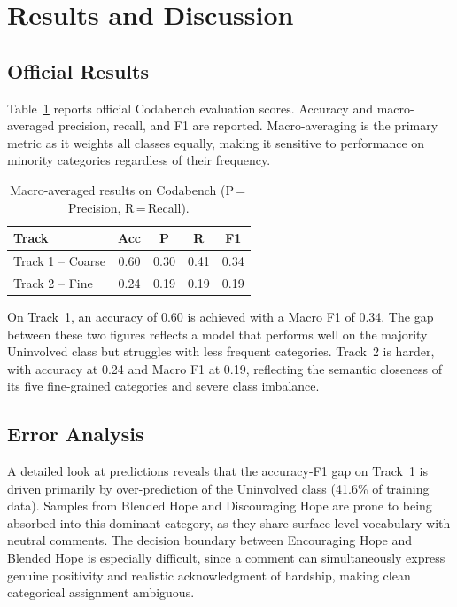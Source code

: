 \documentclass[11pt]{article}
\begin{document}
\section{Results and Discussion}

\subsection{Official Results}

Table~\ref{tab:results} reports official Codabench evaluation
scores. Accuracy and macro-averaged precision,
recall, and F1 are reported. Macro-averaging is
the primary metric as it weights all classes equally,
making it sensitive to performance on minority categories regardless of their frequency.

\begin{table}[h]
\centering
\begin{tabular}{lcccc}
\toprule
\textbf{Track} & \textbf{Acc} & \textbf{P} & \textbf{R} & \textbf{F1} \\
\midrule
Track 1 -- Coarse & 0.60 & 0.30 & 0.41 & 0.34 \\
Track 2 -- Fine   & 0.24 & 0.19 & 0.19 & 0.19 \\
\bottomrule
\end{tabular}
\caption{Macro-averaged results on Codabench (P\,=\,Precision, R\,=\,Recall).}
\label{tab:results}
\end{table}

On Track~1, an accuracy of 0.60 is achieved with
a Macro F1 of 0.34. The gap between these two
figures reflects a model that performs well on the
majority Uninvolved class but struggles with less
frequent categories. Track~2 is harder, with accuracy at 0.24 and Macro F1 at 0.19, reflecting the semantic closeness of its five fine-grained categories
and severe class imbalance.

\subsection{Error Analysis}

A detailed look at predictions reveals that the
accuracy-F1 gap on Track~1 is driven primarily
by over-prediction of the Uninvolved class (41.6\%
of training data). Samples from Blended Hope and
Discouraging Hope are prone to being absorbed
into this dominant category, as they share surface-level vocabulary with neutral comments. The decision boundary between Encouraging Hope and
Blended Hope is especially difficult, since a comment can simultaneously express genuine positivity
and realistic acknowledgment of hardship, making
clean categorical assignment ambiguous.
\end{document}
